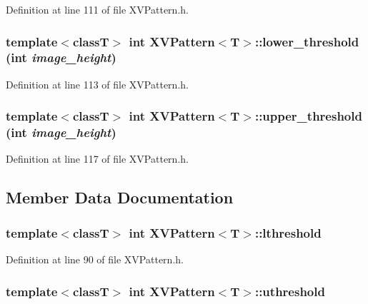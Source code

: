 Definition at line 111 of file XVPattern.h.\label{XVPattern_a7}
\hypertarget{class_XVPattern_a7}{
\subsubsection[lower_threshold]{\setlength{\rightskip}{0pt plus 5cm}template$<$classT$>$ int XVPattern$<$T$>$::lower\_\-threshold (int {\em image\_\-height})}}




Definition at line 113 of file XVPattern.h.\label{XVPattern_a8}
\hypertarget{class_XVPattern_a8}{
\subsubsection[upper_threshold]{\setlength{\rightskip}{0pt plus 5cm}template$<$classT$>$ int XVPattern$<$T$>$::upper\_\-threshold (int {\em image\_\-height})}}




Definition at line 117 of file XVPattern.h.

\subsection{Member Data Documentation}
\label{XVPattern_n0}
\hypertarget{class_XVPattern_n0}{
\subsubsection[lthreshold]{\setlength{\rightskip}{0pt plus 5cm}template$<$classT$>$ int XVPattern$<$T$>$::lthreshold}}




Definition at line 90 of file XVPattern.h.\label{XVPattern_n1}
\hypertarget{class_XVPattern_n1}{
\subsubsection[uthreshold]{\setlength{\rightskip}{0pt plus 5cm}template$<$classT$>$ int XVPattern$<$T$>$::uthreshold}}




